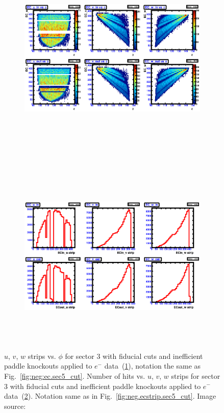 \begin{figure}[htpb]
  \centering
  \begin{subfigure}[b]{\figwidth}
  \includegraphics[width=\figwidth, height=3.5in,valign=c]{figures/calib/ec/pim_ecuvw_phi_afterGeoFid_sec3.eps}\caption{}\label{fig:EC_III_III}
  \end{subfigure}%
  \\
  \begin{subfigure}[b]{\figwidth}
  \includegraphics[width=\figwidth, height=3.5in,valign=c]{figures/calib/ec/pim_ecuvw_afterGeoFid_sec3.eps}\caption{}\label{fig:EC_IV_III}
  \end{subfigure}%
      \caption { $u$, $v$, $w$ strips vs. $\phi$ for sector 3 with fiducial cuts and inefficient paddle knockouts applied to $e^-$ data~(\ref{fig:EC_III_III}), notation the same as Fig.~\ref{fig:neg:ec.sec5_cut}. Number of hits vs.  $u$, $v$, $w$ strips for sector 3 with fiducial cuts and inefficient paddle knockouts applied to $e^-$ data~(\ref{fig:EC_IV_III}). Notation same as in Fig.~\ref{fig:neg.ecstrip.sec5_cut}. Image source:~\cite{clas.thesis.kunkel}}
        \label{fig:EC_cut_III}
\end{figure}


